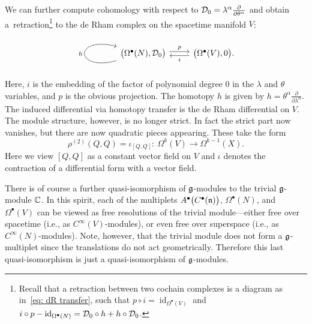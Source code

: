 \documentclass[11pt]{article}
\numberwithin{equation}{section}
\numberwithin{equation}{section}
\DeclareMathOperator{\id}{id}
\begin{document}
\begin{rmk}
	We can further compute cohomology with respect to $\mathcal D_0 = \lambda^\alpha \frac{\partial}{\partial \theta^\alpha}$ and obtain a~retraction\footnote{Recall that a retraction between two cochain complexes is a diagram as in~\eqref{eq: dR transfer}, such that $p \circ i = \id_{\Omega^\bullet(V)}$ and $i \circ p - \id_{\Omega^\bullet(N)} = \cD_0 \circ h + h \circ \cD_0$.} to the de Rham complex on the spacetime manifold $V$:
	\begin{equation} \label{eq: dR transfer}
	\begin{tikzcd}
	\arrow[loop left]{l}{h}\big(\Omega^\bullet(N) , \cD_0\big)\arrow[r, shift left, "p"] & \big(\Omega^\bullet(V) , 0\big).\arrow[l, shift left, "i"]
	\end{tikzcd}
	\end{equation}
	Here, $i$ is the embedding of the factor of polynomial degree 0 in the $\lambda$ and $\theta$ variables, and $p$ is the obvious projection. The homotopy $h$ is given by $h=\theta^\alpha \frac{\partial}{\partial \lambda^\alpha}$.
	The induced differential via homotopy transfer is the de Rham differential on $V$. The module structure, however, is no longer strict. In fact the strict part now vanishes, but there are now quadratic pieces appearing. These take the form
	\begin{equation*}
	\rho^{(2)} (Q , Q) = \iota_{[Q, Q ]} \colon \ \Omega^k(V) \longrightarrow \Omega^{k-1}(X) .
	\end{equation*}
	Here we view $[Q, Q]$ as a constant vector field on $V$ and $\iota$ denotes the contraction of a differential form with a vector field.
	
	
	There is of course a further quasi-isomorphism of $\mathfrak g$-modules to the trivial $\mathfrak g$-module $\mathbb C$. In this spirit, each of the multiplets $A^\bullet\big(C^\bullet(\mathfrak n)\big)$, $\Omega^\bullet(N)$, and $\Omega^\bullet(V)$ can be viewed as free resolutions of the trivial module---either free over spacetime (i.e., as $C^\infty(V)$-modules), or even free over superspace (i.e., as $C^\infty(N)$-modules). Note, however, that the trivial module does not form a $\mathfrak g$-multiplet since the translations do not act geometrically. Therefore this last quasi-isomorphism is just a quasi-isomorphism of $\mathfrak g$-modules.
\end{rmk}
\end{document}
